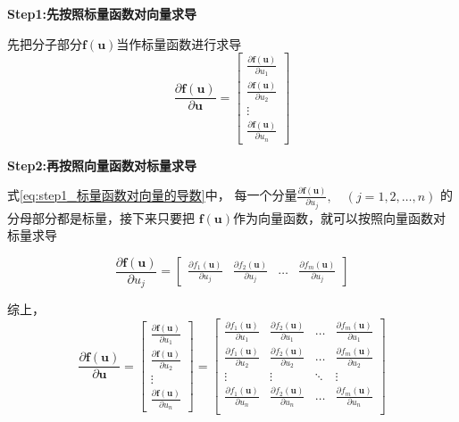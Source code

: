 \documentclass[withoutpreface,bwprint]{NoteBook}
\begin{document}
\textbf{Step1:先按照标量函数对向量求导}

先把分子部分$ \mathbf{f}(\mathbf{u})$当作标量函数进行求导
\begin{equation}
    \label{eq:step1_标量函数对向量的导数}
    \frac{\partial \mathbf{f}(\mathbf{u})}{\partial \mathbf{u}} = 
    \begin{bmatrix}
    \frac{\partial \mathbf{f}(\mathbf{u})}{\partial u_1} \\
    \frac{\partial \mathbf{f}(\mathbf{u})}{\partial u_2} \\
    \vdots \\
    \frac{\partial \mathbf{f}(\mathbf{u})}{\partial u_n}
    \end{bmatrix} 
\end{equation}

\textbf{Step2:再按照向量函数对标量求导}

式\cref{eq:step1_标量函数对向量的导数}中，
每一个分量$\frac{\partial \mathbf{f}(\mathbf{u})}{\partial u_j},\quad (j=1,2,\dots,n)$ 的分母部分都是标量，接下来只要把 $\mathbf{f}(\mathbf{u})$作为向量函数，就可以按照向量函数对标量求导

\begin{equation}
    \label{eq:step2_向量函数对标量求导}
    \frac{\partial \mathbf{f}(\mathbf{u})}{\partial u_j}
    =
    \begin{bmatrix}
        \frac{\partial f_1(\mathbf{u})}{\partial u_j} & \frac{\partial f_2(\mathbf{u})}{\partial u_j}  & \dots & \frac{\partial f_m(\mathbf{u})}{\partial u_j}
    \end{bmatrix} 
\end{equation}

综上，
\begin{equation}
    \label{eq:向量函数对向量的导数综合式2}
    \frac{\partial \mathbf{f}(\mathbf{u})}{\partial \mathbf{u}} 
    = 
    \begin{bmatrix}
        \frac{\partial \mathbf{f}(\mathbf{u})}{\partial u_1} \\
        \frac{\partial \mathbf{f}(\mathbf{u})}{\partial u_2} \\
        \vdots \\
        \frac{\partial \mathbf{f}(\mathbf{u})}{\partial u_n}
    \end{bmatrix} 
    =
    \begin{bmatrix}
        \frac{\partial f_1(\mathbf{u})}{\partial u_1} & \frac{\partial f_2(\mathbf{u})}{\partial u_1} & \dots & \frac{\partial f_m(\mathbf{u})}{\partial u_1} \\
        \frac{\partial f_1(\mathbf{u})}{\partial u_2} & \frac{\partial f_2(\mathbf{u})}{\partial u_2} & \dots & \frac{\partial f_m(\mathbf{u})}{\partial u_2} \\
        \vdots                                        & \vdots                                        & \ddots & \vdots \\
        \frac{\partial f_1(\mathbf{u})}{\partial u_n} & \frac{\partial f_2(\mathbf{u})}{\partial u_n} & \dots &  \frac{\partial f_m(\mathbf{u})}{\partial u_n}\\
    \end{bmatrix}
\end{equation}
\end{document}
